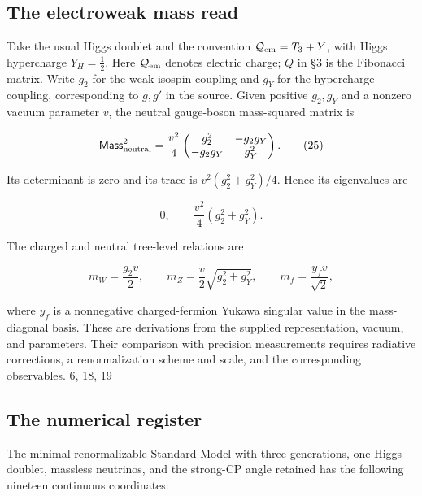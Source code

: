 \hypertarget{the-electroweak-mass-read}{%
\subsection{The electroweak mass read}\label{the-electroweak-mass-read}}

Take the usual Higgs doublet and the convention \(\mathcal Q_{\rm em}=T_3+Y\), with Higgs hypercharge \(Y_H=\tfrac12\). Here \(\mathcal Q_{\rm em}\) denotes electric charge; \(Q\) in §3 is the Fibonacci matrix. Write \(g_2\) for the weak-isospin coupling and \(g_Y\) for the hypercharge coupling, corresponding to \(g,g'\) in the source. Given positive \(g_2,g_Y\) and a nonzero vacuum parameter \(v\), the neutral gauge-boson mass-squared matrix is

\[
\mathsf{Mass}^2_{\rm neutral}=\frac{v^2}{4}
\begin{pmatrix}
g_2^2&-g_2g_Y\\
-g_2g_Y&g_Y^2
\end{pmatrix}.
\tag{25}
\]

Its determinant is zero and its trace is \(v^2(g_2^2+g_Y^2)/4\). Hence its eigenvalues are

\[
0,\qquad \frac{v^2}{4}(g_2^2+g_Y^2).
\tag{26}
\]

The charged and neutral tree-level relations are

\[
m_W=\frac{g_2v}{2},
\qquad
m_Z=\frac{v}{2}\sqrt{g_2^2+g_Y^2},
\qquad
m_f=\frac{y_fv}{\sqrt2},
\tag{27}
\]

where \(y_f\) is a nonnegative charged-fermion Yukawa singular value in the mass-diagonal basis. These are derivations from the supplied representation, vacuum, and parameters. Their comparison with precision measurements requires radiative corrections, a renormalization scheme and scale, and the corresponding observables. \href{https://chatgpt.com/library?file_id=libfile_5aa28715b83881919460603dea30bc25\&account_id=personal}{6}, \href{https://doi.org/10.1103/PhysRevLett.19.1264}{18}, \href{https://pdg.lbl.gov/2026/reviews/standard_model_and_related.html}{19}

\hypertarget{the-numerical-register}{%
\subsection{The numerical register}\label{the-numerical-register}}

The minimal renormalizable Standard Model with three generations, one Higgs doublet, massless neutrinos, and the strong-CP angle retained has the following nineteen continuous coordinates:

